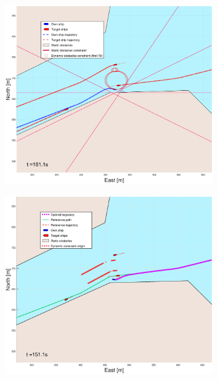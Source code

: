 \begin{figure}[!ht]
\begin{subfigure}[b]{0.499\textwidth}
    \end{subfigure}
    \hfill
    \\
    \begin{subfigure}[b]{0.49\textwidth}
        \centering
        \includegraphics[width=\textwidth]{Images/Figures/Trheimfjord/_Simple_0fig1_time=151}
    \end{subfigure}
    \hfill
    \begin{subfigure}[b]{0.499\textwidth}
        \centering
        \includegraphics[width=\textwidth]{Images/Figures/Trheimfjord/_Simple_0fig999_time=151}
    \end{subfigure}
    \hfill
\end{figure}%
